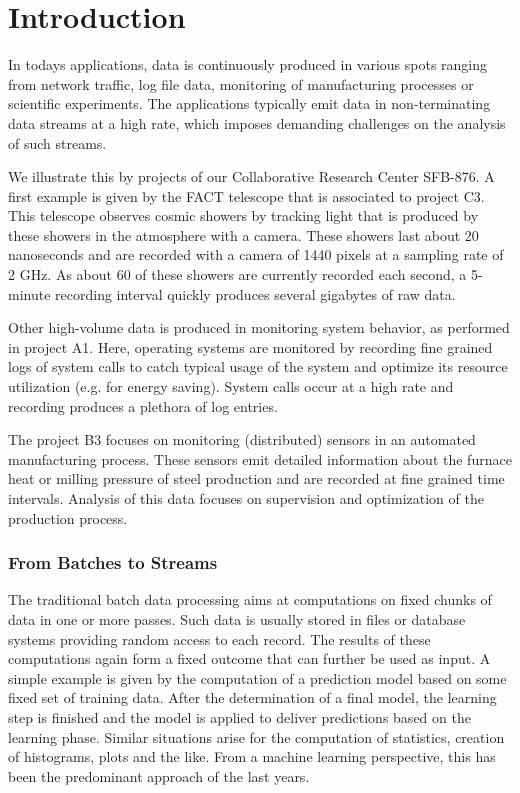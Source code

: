 \section{\label{sec:intro}Introduction}
In todays applications, data is continuously produced in various spots
ranging from network traffic, log file data, monitoring of
manufacturing processes or scientific experiments. The applications
typically emit data in non-terminating data streams at a high rate,
which imposes demanding challenges on the analysis of such streams.

We illustrate this by projects of our Collaborative Research Center
SFB-876. A first example is given by the FACT telescope that is
associated to project C3. This telescope observes cosmic showers by
tracking light that is produced by these showers in the atmosphere
with a camera.  These showers last about 20 nanoseconds and are
recorded with a camera of 1440 pixels at a sampling rate of 2 GHz. As
about 60 of these showers are currently recorded each second, a
5-minute recording interval quickly produces several gigabytes of raw
data.

Other high-volume data is produced in monitoring system behavior, as
performed in project A1. Here, operating systems are monitored by
recording fine grained logs of system calls to catch typical usage of
the system and optimize its resource utilization (e.g. for energy
saving). System calls occur at a high rate and recording produces a
plethora of log entries.

The project B3 focuses on monitoring (distributed) sensors in an
automated manufacturing process. These sensors emit detailed
information about the furnace heat or milling pressure of steel production
and are recorded at fine grained time intervals. Analysis of this data
focuses on supervision and optimization of the production process.

\subsubsection*{From Batches to Streams}
The traditional batch data processing aims at computations on fixed
chunks of data in one or more passes. Such data is usually stored in
files or database systems providing random access to each record. The
results of these computations again form a fixed outcome that can
further be used as input. A simple example is given by the computation
of a prediction model based on some fixed set of training data. After
the determination of a final model, the learning step is finished and
the model is applied to deliver predictions based on the learning
phase. Similar situations arise for the computation of statistics,
creation of histograms, plots and the like. From a machine learning
perspective, this has been the predominant approach of the last years.

